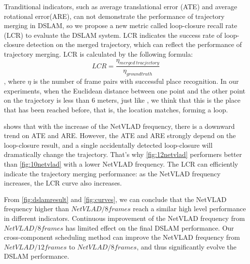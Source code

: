 
Tranditional indicators, such as average translational error (ATE) and average rotational error(ARE), can not demonstrate the performance of trajectory merging in DSLAM, so we propose a new metric called loop-closure recall rate (LCR) to evaluate the DSLAM system. LCR indicates the success rate of loop-closure detection on the merged trajectory, which can reflect the performance of trajectory merging. LCR is calculated by the following formula:$$LCR=\frac{\eta_{merged\ tracjectory}}{\eta_{groundtruth}}$$, where $\eta$ is the number of frame pairs with successful place recognition. In our experiments, when the Euclidean distance between one point  and the other point on the trajectory is less than 6 meters, just like \cite{zhang2018graph}, we think that this is the place that has been reached before, that is, the location matches, forming a loop.

 shows that with the increase of the NetVLAD frequency, there is a downward trend on ATE and ARE. However, the ATE and ARE strongly depend on the loop-closure result, and a single accidentally detected loop-closure will dramatically change the trajectory. That's why \cref{fig:12netvlad} performers better than \cref{fig:10netvlad} with a lower NetVLAD frequency. The LCR can efficiently indicate the trajectory merging performance: as the NetVLAD frequency increases, the LCR curve also increases.

From \cref{fig:dslamresult} and \cref{fig:curves}, we can conclude that the NetVLAD frequency higher than $NetVLAD/8frames$  reach a similar high level performance in different indicators. Continuous improvement of the NetVLAD frequency from $NetVLAD/8frames$ has limited effect on the final DSLAM performance. Our cross-component scheduling method can improve the NetVLAD frequency from  $NetVLAD/12frames$ to  $NetVLAD/8frames$, and thus significantly evolve the DSLAM performance.
